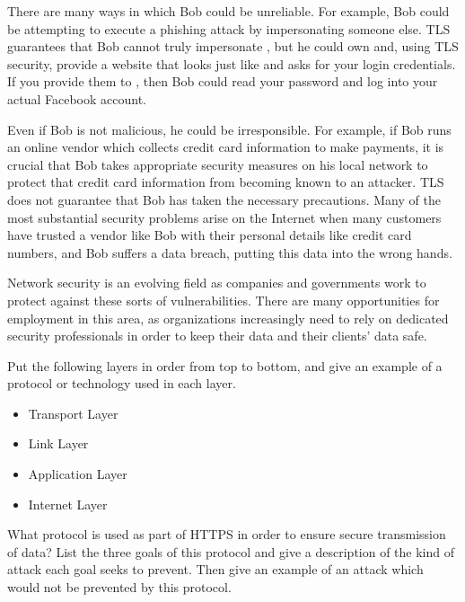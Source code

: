 There are many ways in which Bob could be unreliable. For example, Bob could be attempting to execute a phishing attack by impersonating someone else. TLS guarantees that Bob cannot truly impersonate , but he could own  and, using TLS security, provide a website that looks just like  and asks for your login credentials. If you provide them to , then Bob could read your password and log into your actual Facebook account.

Even if Bob is not malicious, he could be irresponsible. For example, if Bob runs an online vendor which collects credit card information to make payments, it is crucial that Bob takes appropriate security measures on his local network to protect that credit card information from becoming known to an attacker. TLS does not guarantee that Bob has taken the necessary precautions. Many of the most substantial security problems arise on the Internet when many customers have trusted a vendor like Bob with their personal details like credit card numbers, and Bob suffers a data breach, putting this data into the wrong hands.

Network security is an evolving field as companies and governments work to protect against these sorts of vulnerabilities. There are many opportunities for employment in this area, as organizations increasingly need to rely on dedicated security professionals in order to keep their data and their clients' data safe.

\exercisesection

\begin{exercise}
    Put the following layers in order from top to bottom, and give an example of a protocol or technology used in each layer.
    \begin{itemize}
        \item Transport Layer
        \item Link Layer
        \item Application Layer
        \item Internet Layer
    \end{itemize}
\end{exercise}

\begin{exercise}
    What protocol is used as part of HTTPS in order to ensure secure transmission of data? List the three goals of this protocol and give a description of the kind of attack each goal seeks to prevent. Then give an example of an attack which would not be prevented by this protocol.
\end{exercise}

